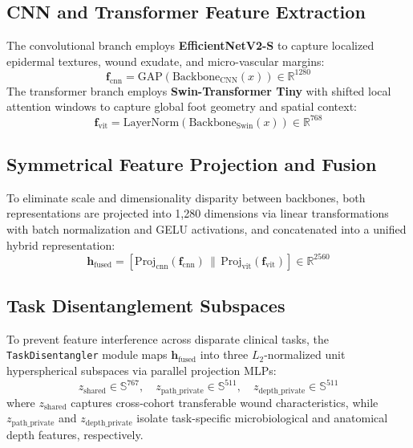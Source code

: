 \documentclass[journal]{IEEEtran}
\begin{document}
\subsection{CNN and Transformer Feature Extraction}
The convolutional branch employs \textbf{EfficientNetV2-S} \cite{tan2021efficientnetv2} to capture localized epidermal textures, wound exudate, and micro-vascular margins:
\begin{equation}
    \mathbf{f}_{\text{cnn}} = \text{GAP}\left( \text{Backbone}_{\text{CNN}}(x) \right) \in \mathbb{R}^{1280}
\end{equation}
The transformer branch employs \textbf{Swin-Transformer Tiny} \cite{liu2021swin} with shifted local attention windows to capture global foot geometry and spatial context:
\begin{equation}
    \mathbf{f}_{\text{vit}} = \text{LayerNorm}\left( \text{Backbone}_{\text{Swin}}(x) \right) \in \mathbb{R}^{768}
\end{equation}

\subsection{Symmetrical Feature Projection and Fusion}
To eliminate scale and dimensionality disparity between backbones, both representations are projected into 1,280 dimensions via linear transformations with batch normalization and GELU activations, and concatenated into a unified hybrid representation:
\begin{equation}
    \mathbf{h}_{\text{fused}} = [\text{Proj}_{\text{cnn}}(\mathbf{f}_{\text{cnn}}) \,\|\, \text{Proj}_{\text{vit}}(\mathbf{f}_{\text{vit}})] \in \mathbb{R}^{2560}
\end{equation}

\subsection{Task Disentanglement Subspaces}
To prevent feature interference across disparate clinical tasks, the \texttt{TaskDisentangler} module maps $\mathbf{h}_{\text{fused}}$ into three $L_2$-normalized unit hyperspherical subspaces via parallel projection MLPs:
\begin{equation}
    z_{\text{shared}} \in \mathbb{S}^{767}, \quad z_{\text{path\_private}} \in \mathbb{S}^{511}, \quad z_{\text{depth\_private}} \in \mathbb{S}^{511}
\end{equation}
where $z_{\text{shared}}$ captures cross-cohort transferable wound characteristics, while $z_{\text{path\_private}}$ and $z_{\text{depth\_private}}$ isolate task-specific microbiological and anatomical depth features, respectively.
\end{document}
